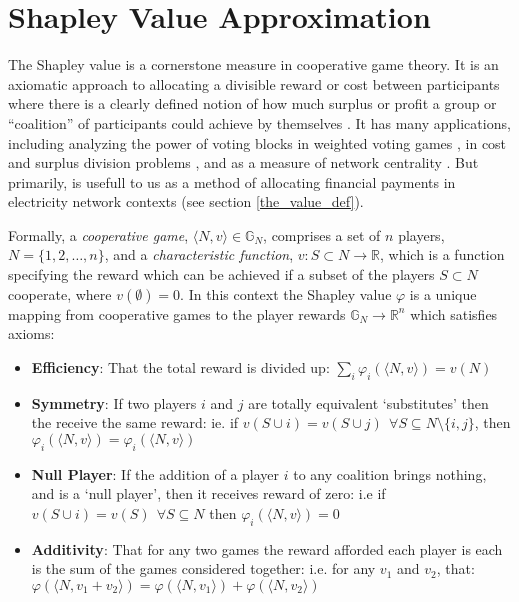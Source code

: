 
\pagebreak
\section{Shapley Value Approximation}\label{sec:shapley}

The Shapley value is a cornerstone measure in cooperative game theory. 
It is an axiomatic approach to allocating a divisible reward or cost between participants where there is a clearly defined notion of how much surplus or profit a group or ``coalition'' of participants could achieve by themselves \citep{ChalkiadakisEtAl2012}.
It has many applications, 
including analyzing the power of voting blocks in weighted voting games \citep{Bachrach2009ApproximatingPI}, 
in cost and surplus division problems  \citep{AzizEtal2016,archie_paper1}, 
and as a measure of network centrality \citep{Michalak:2013}.
But primarily, is usefull to us as a method of allocating financial payments in electricity network contexts (see section \ref{the_value_def}).

Formally, a \textit{cooperative game}, $\langle N,v\rangle\in\mathbb{G}_N$, comprises a set of $n$ players, $N=\{1,2,\dots,n\}$, and a \textit{characteristic function}, $v:S\subset N\rightarrow \mathbb{R}$, which is a function specifying the reward which can be achieved if a subset of the players $S\subset N$ cooperate, where $v(\emptyset)=0$.
In this context the Shapley value $\varphi$ is a unique mapping from cooperative games to the player rewards $\mathbb{G}_N\rightarrow\mathbb{R}^n$ which satisfies axioms:

\begin{itemize}
\item	
\textbf{Efficiency}: That the total reward is divided up: $\sum_i\varphi_i(\langle N,v\rangle) = v(N)$
\item	
\textbf{Symmetry}: If two players $i$ and $j$ are totally equivalent `substitutes' then the receive the same reward: ie. if $v(S\cup i)=v(S\cup j)~~\forall S\subseteq N\setminus\{i,j\}$, then $\varphi_i(\langle N,v\rangle) = \varphi_i(\langle N,v\rangle)$
\item	
\textbf{Null Player}: If the addition of a player $i$ to any coalition brings nothing, and is a `null player', then it receives reward of zero: i.e if $v(S\cup i)=v(S)~~\forall S\subseteq N$ then $\varphi_i(\langle N,v\rangle)=0$
\item	
\textbf{Additivity}: That for any two games the reward afforded each player is each is the sum of the games considered together: i.e. for any $v_1$ and $v_2$, that: $\varphi(\langle N,v_1+v_2\rangle)=\varphi(\langle N,v_1 \rangle) + \varphi(\langle N,v_2\rangle)$
\end{itemize}

